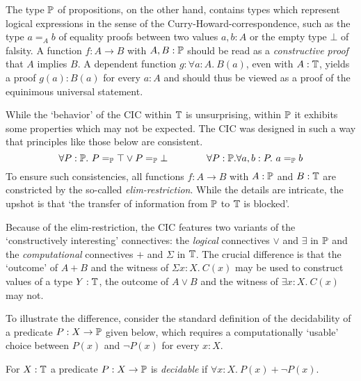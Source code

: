 The type $\mathbb{P}$ of propositions, on the other hand, contains types which
represent logical expressions in the sense of the Curry-Howard-correspondence,
such as the type $a =_A b$ of equality proofs between two values $a, b : A$ or
the empty type $\bot$ of falsity. A function $f : A \to B$ with $A, B : \mathbb{P}$
should be read as a \emph{constructive proof} that $A$ implies
$B$. A dependent function $g : \forall a : A.~B(a)$, even with $A :
\mathbb{T}$, yields a proof $g(a) : B(a)$ for every $a : A$ and should thus be viewed
as a proof of the equinimous universal statement.

While the `behavior' of the CIC within $\mathbb{T}$ is unsurprising, within $\mathbb{P}$
it exhibits some properties which may not be expected. The CIC was designed in
such a way that principles like those below are consistent.
\[
  \forall P : \mathbb{P}.~P =_{\mathbb{P}} \top \vee P =_{\mathbb{P}} \bot
  \qquad \qquad
  \forall P : \mathbb{P}. \forall a, b : P.~a =_{\mathbb{P}} b
\]
To ensure such consistencies, all functions $f : A \to B$ with $A : \mathbb{P}$ and
$B : \mathbb{T}$ are constricted by the so-called \emph{elim-restriction}. While the
details are intricate, the upshot is that `the transfer of information from
$\mathbb{P}$ to $\mathbb{T}$ is blocked'.

Because of the elim-restriction, the CIC features two variants of the
`constructively interesting' connectives: the \emph{logical} connectives $\vee$ and
$\exists$ in $\mathbb{P}$ and the \emph{computational} connectives $+$ and $\Sigma$
in $\mathbb{T}$. The crucial difference is that the `outcome' of $A + B$ and the
witness of $\Sigma x : X.~C(x)$ may be used to construct values of a type $Y :
\mathbb{T}$, the outcome of $A \vee B$ and the witness of $\exists x : X.~C(x)$ may not.

To illustrate the difference, consider the standard definition of the
decidability of a predicate $P : X \to \mathbb{P}$ given below, which requires a
computationally `usable' choice between $P(x)$ and $\neg P(x)$ for every $x : X$.
\begin{definition}
  For $X : \mathbb{T}$ a predicate $P : X \to \mathbb{P}$ is \emph{decidable} if $\forall
  x : X.~P(x) + \neg P(x)$.
\end{definition}

